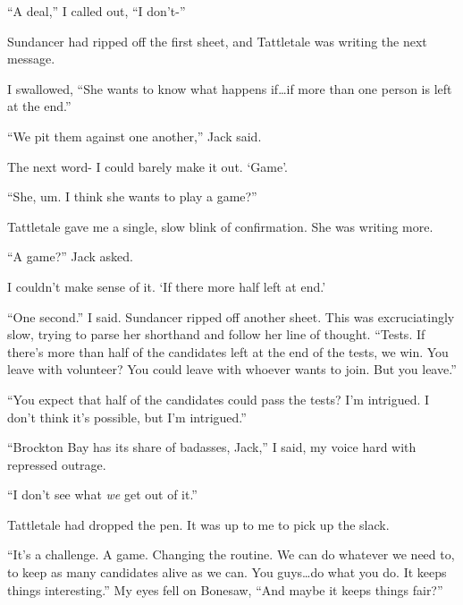 ``A deal,'' I called out, ``I don't-''



Sundancer had ripped off the first sheet, and Tattletale was writing the next message.



I swallowed, ``She wants to know what happens if\ldots if more than one person is left at the end.''



``We pit them against one another,'' Jack said.



The next word- I could barely make it out.  `Game'.



``She, um.  I think she wants to play a game?''



Tattletale gave me a single, slow blink of confirmation.  She was writing more.



``A game?'' Jack asked.



I couldn't make sense of it.  `If there more half left at end.'



``One second.''  I said.  Sundancer ripped off another sheet.  This was excruciatingly slow, trying to parse her shorthand and follow her line of thought.  ``Tests.  If there's more than half of the candidates left at the end of the tests, we win.  You leave with volunteer?  You could leave with whoever wants to join.  But you leave.''



``You expect that half of the candidates could pass the tests?  I'm intrigued.  I don't think it's possible, but I'm intrigued.''



``Brockton Bay has its share of badasses, Jack,'' I said, my voice hard with repressed outrage.



``I don't see what \emph{we} get out of it.''



Tattletale had dropped the pen.  It was up to me to pick up the slack.



``It's a challenge.  A game.  Changing the routine.  We can do whatever we need to, to keep as many candidates alive as we can.  You guys\ldots do what you do.  It keeps things interesting.''  My eyes fell on Bonesaw, ``And maybe it keeps things fair?''



